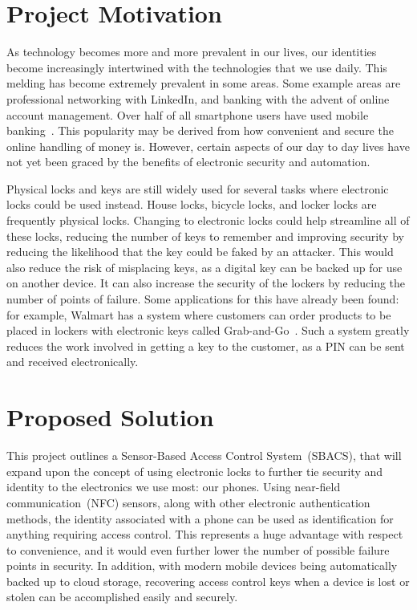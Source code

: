 \documentclass[12pt]{report}
\let\Oldsection\section
\renewcommand{\section}{\FloatBarrier\Oldsection}
\begin{document}
\section{Project Motivation} \label{project-motivation}

As technology becomes more and more prevalent in our lives, our identities become increasingly intertwined with the
technologies that we use daily. This melding has become extremely prevalent in some areas. Some example areas are
professional networking with LinkedIn, and banking with the advent of online account management. Over half of all
smartphone users have used mobile banking~\autocite{MOBILEBANKING}. This popularity may be derived
from how convenient and secure the online handling of money is. However, certain aspects of our day to day lives
have not yet been graced by the benefits of electronic security and automation.

Physical locks and keys are still widely used for several tasks where electronic locks could be used instead. House
locks, bicycle locks, and locker locks are frequently physical locks. Changing to electronic locks could help streamline
all of these locks, reducing the number of keys to remember and improving security by reducing the likelihood that the
key could be faked by an attacker. This would also reduce the risk of misplacing keys, as a digital key can be backed 
up for use on another device. It can also increase the security of the lockers by reducing the number of points of failure.
Some applications for this have already been found: for example, Walmart has a system 
where customers can order products to be placed in lockers with electronic keys called Grab-and-Go~\autocite{WALMART}. 
Such a system greatly reduces the work involved in getting a key to the customer, as a PIN can be sent and received 
electronically.

\section{Proposed Solution} \label{proposed-solution}

This project outlines a Sensor-Based Access Control System~(SBACS), that will expand upon the concept of using electronic
locks to further tie security and identity to the electronics we use most: our phones. Using near-field 
communication~(NFC) sensors, along with other electronic authentication methods, the identity associated with a phone
can be used as
identification for anything requiring access control. This represents a huge advantage with respect to convenience, and 
it would even further lower the number of possible failure points in security. In addition, with modern mobile devices 
being automatically backed up to cloud storage, recovering access control keys when a device is lost or stolen can be accomplished easily and securely.
\end{document}
